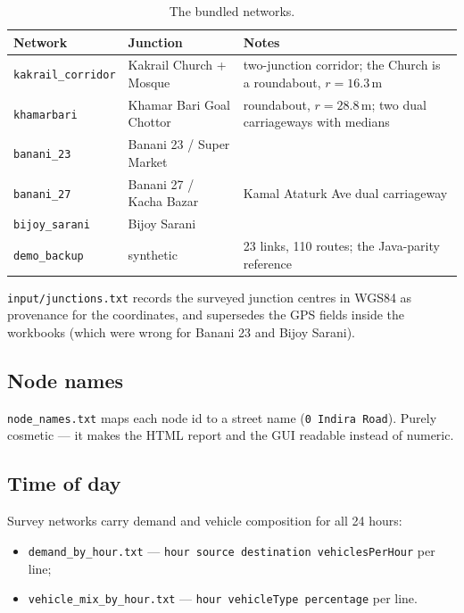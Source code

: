 \documentclass[11pt, a4paper]{article}
\newcommand{\code}[1]{\texttt{#1}}
\begin{document}
\begin{table}[h!]
\centering
\begin{tabularx}{\textwidth}{l l X}
\toprule
\textbf{Network} & \textbf{Junction} & \textbf{Notes} \\
\midrule
\code{kakrail\_corridor} & Kakrail Church + Mosque & two-junction corridor; the Church is a roundabout, $r = 16.3$\,m \\
\code{khamarbari} & Khamar Bari Goal Chottor & roundabout, $r = 28.8$\,m; two dual carriageways with medians \\
\code{banani\_23} & Banani 23 / Super Market & \\
\code{banani\_27} & Banani 27 / Kacha Bazar & Kamal Ataturk Ave dual carriageway \\
\code{bijoy\_sarani} & Bijoy Sarani & \\
\code{demo\_backup} & synthetic & 23 links, 110 routes; the Java-parity reference \\
\bottomrule
\end{tabularx}
\caption{The bundled networks.}
\end{table}

\code{input/junctions.txt} records the surveyed junction centres in WGS84 as
provenance for the coordinates, and supersedes the GPS fields inside the
workbooks (which were wrong for Banani 23 and Bijoy Sarani).

\subsection{Node names}

\code{node\_names.txt} maps each node id to a street name (\code{0 Indira Road}).
Purely cosmetic --- it makes the HTML report and the GUI readable instead of
numeric.

\subsection{Time of day}

Survey networks carry demand and vehicle composition for all 24 hours:

\begin{itemize}
    \item \code{demand\_by\_hour.txt} ---
          \code{hour source destination vehiclesPerHour} per line;
    \item \code{vehicle\_mix\_by\_hour.txt} ---
          \code{hour vehicleType percentage} per line.
\end{itemize}
\end{document}
